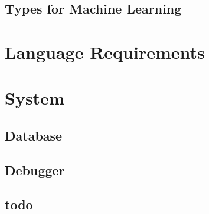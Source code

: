 \documentclass[11pt, oneside]{article}   	%
\theoremstyle{definition}
\begin{document}
\subsection{Types for Machine Learning}

\section{Language Requirements}

\section{System}

\subsection{Database}

\subsection{Debugger}

\subsection{todo}
\end{document}

